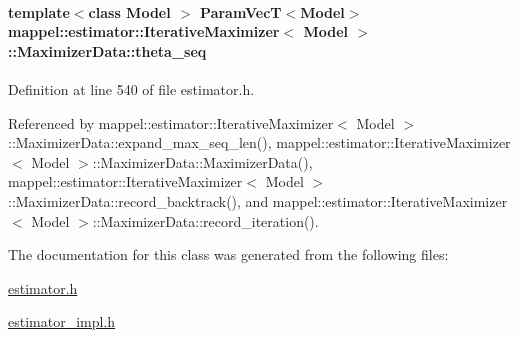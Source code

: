 \paragraph[{\texorpdfstring{theta\+\_\+seq}{theta_seq}}]{\setlength{\rightskip}{0pt plus 5cm}template$<$class Model $>$ {\bf Param\+VecT}$<$Model$>$ {\bf mappel\+::estimator\+::\+Iterative\+Maximizer}$<$ Model $>$\+::Maximizer\+Data\+::theta\+\_\+seq\hspace{0.3cm}{\ttfamily [protected]}}\hypertarget{classmappel_1_1estimator_1_1IterativeMaximizer_1_1MaximizerData_a7fd34d49221c35e0e5977b8349c543c5}{}\label{classmappel_1_1estimator_1_1IterativeMaximizer_1_1MaximizerData_a7fd34d49221c35e0e5977b8349c543c5}


Definition at line 540 of file estimator.\+h.



Referenced by mappel\+::estimator\+::\+Iterative\+Maximizer$<$ Model $>$\+::\+Maximizer\+Data\+::expand\+\_\+max\+\_\+seq\+\_\+len(), mappel\+::estimator\+::\+Iterative\+Maximizer$<$ Model $>$\+::\+Maximizer\+Data\+::\+Maximizer\+Data(), mappel\+::estimator\+::\+Iterative\+Maximizer$<$ Model $>$\+::\+Maximizer\+Data\+::record\+\_\+backtrack(), and mappel\+::estimator\+::\+Iterative\+Maximizer$<$ Model $>$\+::\+Maximizer\+Data\+::record\+\_\+iteration().



The documentation for this class was generated from the following files\+:\begin{DoxyCompactItemize}
\item 
\hyperlink{estimator_8h}{estimator.\+h}\item 
\hyperlink{estimator__impl_8h}{estimator\+\_\+impl.\+h}\end{DoxyCompactItemize}
